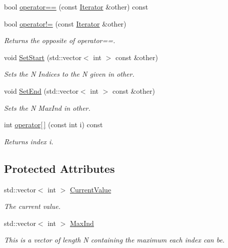 \begin{DoxyCompactItemize}
bool \hyperlink{classJKBuilder_1_1Iterator_a1ea001976a5bc8ae8dc365e2a912b59a}{operator==} (const \hyperlink{classJKBuilder_1_1Iterator}{Iterator} \&other) const 
\item 
bool \hyperlink{classJKBuilder_1_1Iterator_a8c06af8ae0d9d1614ae9f81629275926}{operator!=} (const \hyperlink{classJKBuilder_1_1Iterator}{Iterator} \&other)
\begin{DoxyCompactList}\small\item\em Returns the opposite of operator==. \item\end{DoxyCompactList}\item 
void \hyperlink{classJKBuilder_1_1Iterator_aa83de505e29125c1d3ac7bb1b13ca15a}{SetStart} (std::vector$<$ int $>$ const \&other)
\begin{DoxyCompactList}\small\item\em Sets the N Indices to the N given in other. \item\end{DoxyCompactList}\item 
void \hyperlink{classJKBuilder_1_1Iterator_aad84ec668b5f41210db34c540aaa31fc}{SetEnd} (std::vector$<$ int $>$ const \&other)
\begin{DoxyCompactList}\small\item\em Sets the N MaxInd in other. \item\end{DoxyCompactList}\item 
int \hyperlink{classJKBuilder_1_1Iterator_a74247cf730a06b23fcb1ec64e5596b25}{operator\mbox{[}$\,$\mbox{]}} (const int i) const 
\begin{DoxyCompactList}\small\item\em Returns index i. \item\end{DoxyCompactList}\end{DoxyCompactItemize}
\subsection*{Protected Attributes}
\begin{DoxyCompactItemize}
\item 
std::vector$<$ int $>$ \hyperlink{classJKBuilder_1_1Iterator_a20ca24f6d827aba144bb087c4bcb74a0}{CurrentValue}
\begin{DoxyCompactList}\small\item\em The current value. \item\end{DoxyCompactList}\item 
std::vector$<$ int $>$ \hyperlink{classJKBuilder_1_1Iterator_ab6b56d3c4e9353bc938dd6249cde9ca0}{MaxInd}
\begin{DoxyCompactList}\small\item\em This is a vector of length N containing the maximum each index can be. \item\end{DoxyCompactList}\end{DoxyCompactItemize}


